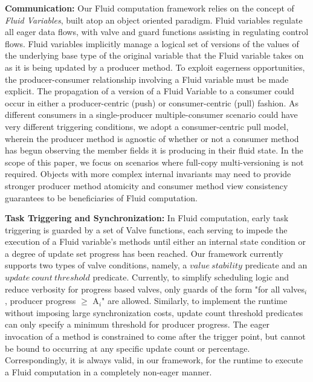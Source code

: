 \noindent\textbf{Communication:} Our Fluid computation framework relies on the concept of \emph{Fluid Variables}, built atop an object oriented paradigm. Fluid variables regulate all eager data flows, with valve and guard functions assisting in regulating control flows. Fluid variables implicitly manage a logical set of versions of the values of the underlying base type of the original variable that the Fluid variable takes on as it is being updated by a producer method. To exploit eagerness opportunities, the producer-consumer relationship involving a Fluid variable must be made explicit. The propagation of a version of a Fluid Variable to a consumer could occur in either a producer-centric (push) or consumer-centric (pull) fashion. As different consumers in a single-producer multiple-consumer scenario could have very different triggering conditions, we adopt a consumer-centric pull model, wherein the producer method is agnostic of whether or not a consumer method has begun observing the member fields it is producing in their fluid state. In the scope of this paper, we focus on scenarios where full-copy multi-versioning is not required. Objects with more complex internal invariants may need to provide stronger producer method atomicity and consumer method view consistency guarantees to be beneficiaries of Fluid computation.

\noindent\textbf{Task Triggering and Synchronization:} In Fluid computation, early task triggering is guarded by a set of Valve functions, each serving to impede the execution of a Fluid variable's methods until either an internal state condition or a degree of update set progress has been reached. Our framework currently supports two types of valve conditions, namely, a $value\ stability$ predicate and an $update\ count\ threshold$ predicate. Currently, to simplify scheduling logic and reduce verbosity for progress based valves, only guards of the form "for all valves$_i$, producer progress $\geq$ A$_i$" are allowed. Similarly, to implement the runtime without imposing large synchronization costs, update count threshold predicates can only specify a minimum threshold for producer progress. The eager invocation of a method is constrained to come after the trigger point, but cannot be bound to occurring at any specific update count or percentage. Correspondingly, it is always valid, in our framework, for the runtime to execute a Fluid computation in a completely non-eager manner.

